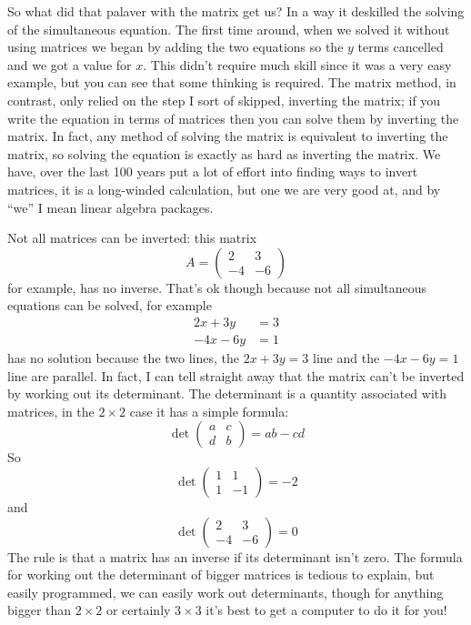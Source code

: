 \documentclass[12pt]{article}
\begin{document}
So what did that palaver with the matrix get us? In a way it deskilled
the solving of the simultaneous equation.  The first time around, when
we solved it without using matrices we began by adding the two
equations so the $y$ terms cancelled and we got a value for $x$. This
didn't require much skill since it was a very easy example, but you
can see that some thinking is required. The matrix method, in
contrast, only relied on the step I sort of skipped, inverting the
matrix; if you write the equation in terms of matrices then you can
solve them by inverting the matrix. In fact, any method of solving the
matrix is equivalent to inverting the matrix, so solving the equation
is exactly as hard as inverting the matrix. We have, over the last 100
years put a lot of effort into finding ways to invert matrices, it is
a long-winded calculation, but one we are very good at, and by ``we''
I mean linear algebra packages.

Not all matrices can be inverted: this matrix
\begin{equation}
  A=\begin{pmatrix}
2 & 3 \\
-4 & -6
  \end{pmatrix}
\end{equation}
for example, has no inverse. That's ok though because not all
simultaneous equations can be solved, for example
\begin{equation}
\begin{aligned}
2x + 3y &= 3 \\
-4x - 6y &= 1
\end{aligned}
\end{equation}
has no solution because the two lines, the $2x+3y=3$ line and the
$-4x-6y=1$ line are parallel. In fact, I can tell straight away that
the matrix can't be inverted by working out its determinant. The determinant is a quantity associated with matrices, in the $2\times 2$ case it has a simple formula:
\begin{equation}
  \det{\begin{pmatrix}
a & c \\
d & b
  \end{pmatrix}}=ab-cd
\end{equation}
So
\begin{equation}
  \det{\begin{pmatrix}
1 & 1 \\
1 & -1
  \end{pmatrix}}=-2
\end{equation}
and
\begin{equation}
  \det{\begin{pmatrix}
2 & 3 \\
-4 & -6
  \end{pmatrix}}=0
\end{equation}
The rule is that a matrix has an inverse if its determinant isn't
zero. The formula for working out the determinant of bigger matrices
is tedious to explain, but easily programmed, we can easily work out determinants, though for anything bigger than $2\times 2$ or certainly $3\times 3$ it's best to get a computer to do it for you!
\end{document}
